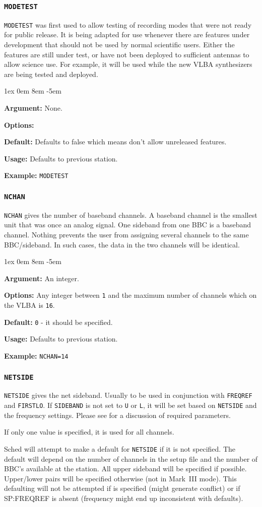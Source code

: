 \documentclass{report}
\newcommand{\rcwbox}[5]{
  \begin{list}{}{\parsep 1ex  \itemsep 0em
                 \leftmargin 8em  \itemindent -5em }
    \item {\bf Argument:} #1
    \item {\bf Options:}  #2
    \item {\bf Default:}  #3
    \item {\bf Usage:}    #4
    \item {\bf Example:}  #5
  \end{list}
}
\begin{document}
\subsubsection{\label{SP:MODETEST}{\tt MODETEST}}

{\tt MODETEST} was first used to allow testing of recording modes
that were not ready for public release.  It is being adapted for
use whenever there are features under development that should not
be used by normal scientific users.  Either the features are still
under test, or have not been deployed to sufficient antennas to 
allow science use.  For example, it will be used while the new
VLBA synthesizers are being tested and deployed.

\rcwbox
{None.}
{}
{Defaults to false which means don't allow unreleased features.}
{Defaults to previous station.}
{{\tt MODETEST}}



\subsubsection{\label{SP:NCHAN}{\tt NCHAN}}

{\tt NCHAN} gives the number of baseband channels. A baseband channel
is the smallest unit that was once an analog signal. One sideband from
one BBC is a baseband channel. Nothing prevents the user from
assigning several channels to the same BBC/sideband. In such cases,
the data in the two channels will be identical.

\rcwbox
{An integer.}
{Any integer between {\tt 1} and the maximum number of channels which
on the VLBA is {\tt 16}.}
{{\tt 0} - it should be specified.}
{Defaults to previous station.}
{{\tt NCHAN=14}}


\subsubsection{\label{SP:NETSIDE}{\tt NETSIDE}}

{\tt NETSIDE} gives the net sideband. Usually to be used in
conjunction with {\tt FREQREF} and {\tt FIRSTLO}. If {\tt SIDEBAND} is
not set to {\tt U} or {\tt L}, it will be set based on {\tt NETSIDE}
and the frequency settings. Please see
 for a discussion of required
parameters.

If only one value is specified, it is used for all channels.

Sched will attempt to make a default for {\tt NETSIDE} if it is
not specified.  The default will depend on the number of channels
in the setup file and the number of BBC's available at the station.
All upper sideband will be specified if possible.  Upper/lower pairs
will be specified otherwise (not in Mark~III mode).  This defaulting
will not be attempted if  is
specified (might generate conflict) or if 
{SP:FREQREF} is absent (frequency might end up inconsistent with
defaults).
\end{document}
